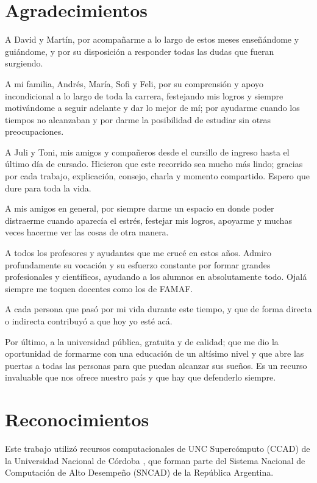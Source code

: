 \documentclass[a4paper,12pt,spanish]{book}
\begin{document}

\cleardoublepage


\clearpage

\thispagestyle{empty}
\chapter*{Agradecimientos}
A David y Martín, por acompañarme a lo largo de estos meses enseñándome y guiándome,
y por su disposición a responder todas las dudas que fueran surgiendo.

A mi familia, Andrés, María, Sofi y Feli, por su comprensión y apoyo incondicional a lo
largo de toda la carrera, festejando mis logros y siempre motivándome a seguir adelante y
dar lo mejor de mí; por ayudarme cuando los tiempos no alcanzaban y por darme la
posibilidad de estudiar sin otras preocupaciones.

A Juli y Toni, mis amigos y compañeros desde el cursillo de ingreso hasta el último día de
cursado. Hicieron que este recorrido sea mucho más lindo; gracias por cada trabajo,
explicación, consejo, charla y momento compartido. Espero que dure para toda la vida.

A mis amigos en general, por siempre darme un espacio en donde poder distraerme
cuando aparecía el estrés, festejar mis logros, apoyarme y muchas veces hacerme ver
las cosas de otra manera.

A todos los profesores y ayudantes que me crucé en estos años. Admiro profundamente su
vocación y su esfuerzo constante por formar grandes profesionales y científicos, ayudando
a los alumnos en absolutamente todo. Ojalá siempre me toquen docentes como los de FAMAF.

A cada persona que pasó por mi vida durante este tiempo, y que de forma directa
o indirecta contribuyó a que hoy yo esté acá.

Por último, a la universidad pública, gratuita y de calidad; que me dio la oportunidad de
formarme con una educación de un altísimo nivel y que abre las puertas a todas las
personas para que puedan alcanzar sus sueños. Es un recurso invaluable que nos ofrece
nuestro país y que hay que defenderlo siempre.
\clearpage

\thispagestyle{empty}
\chapter*{Reconocimientos}
Este trabajo utilizó recursos computacionales de UNC Supercómputo (CCAD) de la Universidad
Nacional de Córdoba \cite{ccad}, que forman parte del Sistema Nacional de Computación de
Alto Desempeño (SNCAD) de la República Argentina.
\end{document}
